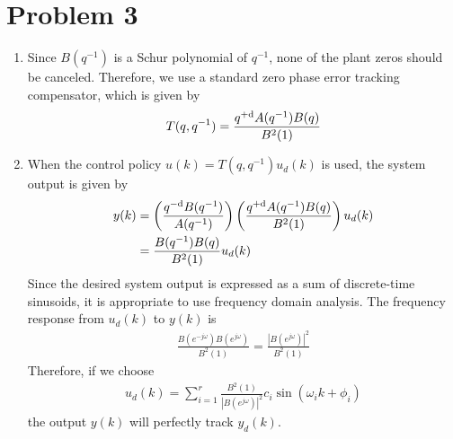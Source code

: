 \section*{Problem 3}

\begin{enumerate}
    \item
    Since $B(q^{-1})$ is a Schur polynomial of $q^{-1}$, none of the plant zeros should be canceled. Therefore, we use a standard zero phase error tracking compensator, which is given by
    \begin{align*}
        T(q,q^{-1}) = \frac{ q^{+\textrm{d}} A(q^{-1}) B(q) }{ B^2(1) }
    \end{align*}
    
    \item
    When the control policy $u(k) = T(q,q^{-1}) u_d(k)$ is used, the system output is given by
    \begin{align*}
        y(k) & = \left( \frac{ q^{-\textrm{d}} B(q^{-1}) }{ A(q^{-1}) } \right)
            \left( \frac{ q^{+\textrm{d}} A(q^{-1}) B(q) }{ B^2(1) } \right) u_d(k) \\
        & = \frac{ B(q^{-1}) B(q) }{ B^2(1) } u_d(k)
    \end{align*}
    Since the desired system output is expressed as a sum of discrete-time sinusoids, it is appropriate to use frequency domain analysis. The frequency response from $u_d(k)$ to $y(k)$ is
    \begin{align*}
        \frac{ B(e^{-j\omega}) B(e^{j\omega}) }{ B^2(1) } = \frac{ |B(e^{j\omega})|^2 }{ B^2(1) }
    \end{align*}
    Therefore, if we choose
    \begin{align*}
        u_d(k) = \sum_{i=1}^r \frac{ B^2(1) }{ |B(e^{j\omega})|^2 } c_i \sin(\omega_i k + \phi_i)
    \end{align*}
    the output $y(k)$ will perfectly track $y_d(k)$.
    
\end{enumerate}